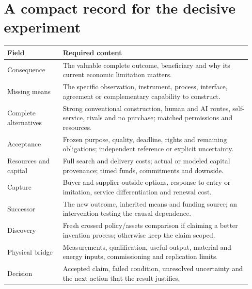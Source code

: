 \documentclass[11pt,letterpaper]{article}
\begin{document}
\section{A compact record for the decisive experiment}
\begingroup\small
\begin{tabularx}{\linewidth}{@{}P{3.1cm}Y@{}}\toprule
Field & Required content\\\midrule
Consequence & The valuable complete outcome, beneficiary and why its current economic limitation matters.\\
Missing means & The specific observation, instrument, process, interface, agreement or complementary capability to construct.\\
Complete alternatives & Strong conventional construction, human and AI routes, self-service, rivals and no purchase; matched permissions and resources.\\
Acceptance & Frozen purpose, quality, deadline, rights and remaining obligations; independent reference or explicit uncertainty.\\
Resources and capital & Full search and delivery costs; actual or modeled capital provenance; timed funds, commitments and downside.\\
Capture & Buyer and supplier outside options, response to entry or imitation, service differentiation and renewal cost.\\
Successor & The new outcome, inherited means and funding source; an intervention testing the causal dependence.\\
Discovery & Fresh crossed policy/assets comparison if claiming a better invention process; otherwise keep the claim scoped.\\
Physical bridge & Measurements, qualification, useful output, material and energy inputs, commissioning and replication limits.\\
Decision & Accepted claim, failed condition, unresolved uncertainty and the next action that the result justifies.\\\bottomrule
\end{tabularx}\endgroup

\clearpage


\end{document}
